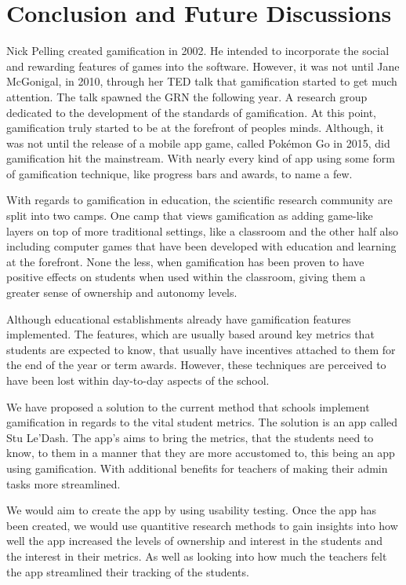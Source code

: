 \documentclass{sigchi}
\begin{document}
\section{Conclusion and Future Discussions}
Nick Pelling created gamification in 2002. He intended to incorporate the social and rewarding features of games into the software. However, it was not until Jane McGonigal, in 2010, through her TED talk that gamification started to get much attention. The talk spawned the GRN the following year. A research group dedicated to the development of the standards of gamification. At this point, gamification truly started to be at the forefront of peoples minds. Although, it was not until the release of a mobile app game, called Pokémon Go in 2015, did gamification hit the mainstream. With nearly every kind of app using some form of gamification technique, like progress bars and awards, to name a few.

With regards to gamification in education, the scientific research community are split into two camps.  One camp that views gamification as adding game-like layers on top of more traditional settings, like a classroom and the other half also including computer games that have been developed with education and learning at the forefront. None the less, when gamification has been proven to have positive effects on students when used within the classroom, giving them a greater sense of ownership and autonomy levels.

Although educational establishments already have gamification features implemented. The features, which are usually based around key metrics that students are expected to know, that usually have incentives attached to them for the end of the year or term awards. However, these techniques are perceived to have been lost within day-to-day aspects of the school. 

We have proposed a solution to the current method that schools implement gamification in regards to the vital student metrics. The solution is an app called Stu Le'Dash. The app's aims to bring the metrics, that the students need to know, to them in a manner that they are more accustomed to, this being an app using gamification. With additional benefits for teachers of making their admin tasks more streamlined.

We would aim to create the app by using usability testing. Once the app has been created, we would use quantitive research methods to gain insights into how well the app increased the levels of ownership and interest in the students and the interest in their metrics. As well as looking into how much the teachers felt the app streamlined their tracking of the students.
\end{document}
